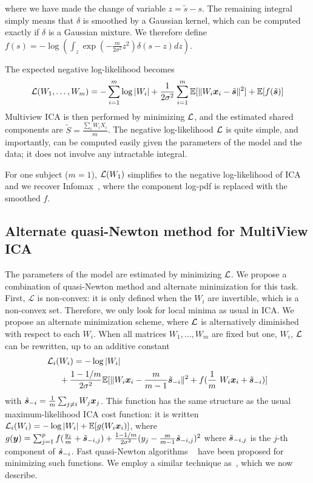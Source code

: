 where we have made the change of variable $z=\tilde{s}-s$. The remaining integral simply means that $\delta$ is smoothed by a Gaussian kernel, which can be computed exactly if $\delta$ is a Gaussian mixture. We therefore define $f(s) = -\log \left(\int_z \exp \left(-\frac{m}{2\sigma^2} z^2 \right) \delta(s-z) dz\right)$.

The expected negative log-likelihood becomes
\begin{equation}
    \label{eq:cost_function}
    \mathcal{L}(W_1, \dots, W_m) = -\sum_{i=1}^m \log|W_i| + \frac1{2\sigma^2}\sum_{i=1}^m \mathbb{E}[\|W_i\boldsymbol{x}_i - \tilde{\boldsymbol{s}}\|^2] + \mathbb{E}[f(\tilde{\boldsymbol{s}})]
\end{equation}
Multiview ICA is then performed by minimizing $\mathcal{L}$, and the estimated shared
components are $\tilde{S} = \frac{\sum_i W_i X_i}{m}$.
The negative log-likelihood $\mathcal{L}$ is quite simple, and importantly, can be computed easily given the parameters of the model and the data; it does not involve any intractable integral.
%

For one subject ($m=1$), $\mathcal{L}(W_1)$ simplifies to the negative log-likelihood of ICA and we recover Infomax~\cite{bell1995information,cardoso1997infomax}, where the component log-pdf is replaced with the smoothed $f$.
%

\subsection{Alternate quasi-Newton method for MultiView ICA}
%
The parameters of the model are estimated by minimizing $\mathcal{L}$.
%
We propose a combination of quasi-Newton method and alternate minimization for this task.
%
First, $\mathcal{L}$ is non-convex: it is only defined when the $W_i$ are invertible, which is a non-convex set.
%
Therefore, we only look for local minima as usual in ICA.
%
We propose an alternate minimization scheme, where $\mathcal{L}$ is alternatively diminished with respect to each $W_i$. 
%
When all matrices $W_1, \dots, W_m$ are fixed but one, $W_i$, $\mathcal{L}$ can be rewritten, up to an additive constant 
\begin{align}
    \label{eq:indiv_loss}
  \loss_i(&W_i) = -\log|W_i| \nonumber  \\&+ \frac{1 - 1/m}{2\sigma^2}\EE[\|W_i\xb_i - \frac{m}{m-1}\tilde{\sbb}_{-i}\|^2 + f(\frac1m W_i \xb_i +\tilde{\sbb}_{-i})] 
\end{align}
with $\tilde{\boldsymbol{s}}_{-i} = \frac1m \sum_{j \neq i}W_j \boldsymbol{x}_j$.
%
This function has the same structure as the usual maximum-likelihood ICA cost
function: it is written $\mathcal{L}_i(W_i) = -\log|W_i| + \mathbb{E}[g(W_i\boldsymbol{x}_i)]$, where $g(\boldsymbol{y})
= \sum_{j=1}^pf(\frac{y_j}{m} + \tilde{\boldsymbol{s}}_{-i, j}) + \frac{1 -
  1/m}{2\sigma^2}(y_j - \frac{m}{m-1}\tilde{\boldsymbol{s}}_{-i, j})^2$ where
$\tilde{\boldsymbol{s}}_{-i, j}$ is the $j$-th component of $\tilde{\boldsymbol{s}}_{-i}$.
%
Fast quasi-Newton algorithms ~\cite{zibulevsky2003blind, ablin2018faster} have been proposed for minimizing such functions.
%
We employ a similar technique as~\cite{zibulevsky2003blind}, which we now describe.

